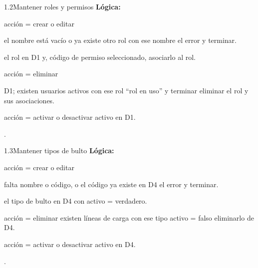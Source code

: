 \begin{minispec}{1.2}{Mantener roles y permisos}
\textbf{Lógica:}
\begin{logica}
    \item {} acción = crear o editar 
    \begin{logica}
        \item {} el nombre está vacío o ya existe otro rol con ese nombre  el error y terminar.
        \item {} el rol en D1 y,  código de permiso seleccionado,
        asociarlo al rol.
    \end{logica}
    \item {} acción = eliminar 
    \begin{logica}
        \item {} D1;  existen usuarios activos con ese rol 
        ``rol en uso'' y terminar  eliminar el rol y sus asociaciones.
    \end{logica}
    \item {} acción = activar o desactivar  activo en D1.
    \item {} .
\end{logica}
\end{minispec}

\begin{minispec}{1.3}{Mantener tipos de bulto}
\textbf{Lógica:}
\begin{logica}
    \item {} acción = crear o editar 
    \begin{logica}
        \item {} falta nombre o código, o el código ya existe en D4 
        el error y terminar.
        \item {} el tipo de bulto en D4 con activo = verdadero.
    \end{logica}
    \item {} acción = eliminar   existen líneas de carga con ese tipo
     activo = falso  eliminarlo de D4.
    \item {} acción = activar o desactivar  activo en D4.
    \item {} .
\end{logica}
\end{minispec}


